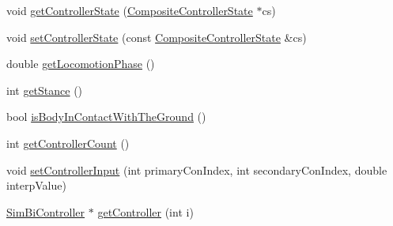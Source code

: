 \begin{DoxyCompactItemize}
\item 
void \hyperlink{classCartWheel_1_1Core_1_1CompositeController_a219265eeea3ee500a306dbd2b871f59c}{getControllerState} (\hyperlink{structCartWheel_1_1Core_1_1CompositeControllerState}{CompositeControllerState} $\ast$cs)
\item 
void \hyperlink{classCartWheel_1_1Core_1_1CompositeController_a5277d117be5a1a6fc5df91d14d99f2aa}{setControllerState} (const \hyperlink{structCartWheel_1_1Core_1_1CompositeControllerState}{CompositeControllerState} \&cs)
\item 
double \hyperlink{classCartWheel_1_1Core_1_1CompositeController_a679090602ea27f39dc59f03cf7565fb0}{getLocomotionPhase} ()
\item 
int \hyperlink{classCartWheel_1_1Core_1_1CompositeController_aeb22cf259010719d7e0c42e91dd725c7}{getStance} ()
\item 
bool \hyperlink{classCartWheel_1_1Core_1_1CompositeController_a8c22faef393c4b88522a3d60cc55d8d8}{isBodyInContactWithTheGround} ()
\item 
int \hyperlink{classCartWheel_1_1Core_1_1CompositeController_a67c93f70a8ff40d41a04af02be4c5eac}{getControllerCount} ()
\item 
void \hyperlink{classCartWheel_1_1Core_1_1CompositeController_aa5626576d57b939b33f9db8bb2d81300}{setControllerInput} (int primaryConIndex, int secondaryConIndex, double interpValue)
\item 
\hyperlink{classCartWheel_1_1Core_1_1SimBiController}{SimBiController} $\ast$ \hyperlink{classCartWheel_1_1Core_1_1CompositeController_a9967228d0cee474d68369866205b4cba}{getController} (int i)
\end{DoxyCompactItemize}
